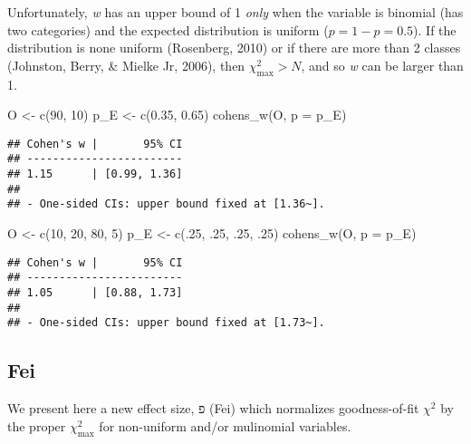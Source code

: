 \documentclass[
]{article}
\newenvironment{Shaded}{\begin{snugshade}}{\end{snugshade}}
\newcommand{\AttributeTok}[1]{\textcolor[rgb]{0.77,0.63,0.00}{#1}}
\newcommand{\DecValTok}[1]{\textcolor[rgb]{0.00,0.00,0.81}{#1}}
\newcommand{\FloatTok}[1]{\textcolor[rgb]{0.00,0.00,0.81}{#1}}
\newcommand{\FunctionTok}[1]{\textcolor[rgb]{0.00,0.00,0.00}{#1}}
\newcommand{\NormalTok}[1]{#1}
\newcommand{\OtherTok}[1]{\textcolor[rgb]{0.56,0.35,0.01}{#1}}
\begin{document}
Unfortunately, \emph{w} has an upper bound of 1 \emph{only} when the
variable is binomial (has two categories) and the expected distribution
is uniform (\(p = 1 - p = 0.5\)). If the distribution is none uniform
(Rosenberg, 2010) or if there are more than 2 classes (Johnston, Berry,
\& Mielke Jr, 2006), then \(\chi^2_\text{max} > N\), and so \emph{w} can
be larger than 1.

\begin{Shaded}
\begin{Highlighting}[]
\NormalTok{O }\OtherTok{\textless{}{-}} \FunctionTok{c}\NormalTok{(}\DecValTok{90}\NormalTok{, }\DecValTok{10}\NormalTok{)}
\NormalTok{p\_E }\OtherTok{\textless{}{-}} \FunctionTok{c}\NormalTok{(}\FloatTok{0.35}\NormalTok{, }\FloatTok{0.65}\NormalTok{)}
\FunctionTok{cohens\_w}\NormalTok{(O, }\AttributeTok{p =}\NormalTok{ p\_E)}
\end{Highlighting}
\end{Shaded}

\begin{verbatim}
## Cohen's w |       95% CI
## ------------------------
## 1.15      | [0.99, 1.36]
## 
## - One-sided CIs: upper bound fixed at [1.36~].
\end{verbatim}

\begin{Shaded}
\begin{Highlighting}[]
\NormalTok{O }\OtherTok{\textless{}{-}} \FunctionTok{c}\NormalTok{(}\DecValTok{10}\NormalTok{, }\DecValTok{20}\NormalTok{, }\DecValTok{80}\NormalTok{, }\DecValTok{5}\NormalTok{)}
\NormalTok{p\_E }\OtherTok{\textless{}{-}} \FunctionTok{c}\NormalTok{(.}\DecValTok{25}\NormalTok{, .}\DecValTok{25}\NormalTok{, .}\DecValTok{25}\NormalTok{, .}\DecValTok{25}\NormalTok{)}
\FunctionTok{cohens\_w}\NormalTok{(O, }\AttributeTok{p =}\NormalTok{ p\_E)}
\end{Highlighting}
\end{Shaded}

\begin{verbatim}
## Cohen's w |       95% CI
## ------------------------
## 1.05      | [0.88, 1.73]
## 
## - One-sided CIs: upper bound fixed at [1.73~].
\end{verbatim}

\hypertarget{fei}{%
\subsection{Fei}\label{fei}}

We present here a new effect size, \(פ\) (Fei) which normalizes
goodness-of-fit \(\chi^2\) by the proper \(\chi^2_\text{max}\) for
non-uniform and/or mulinomial variables.
\end{document}

